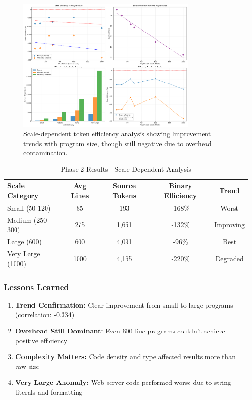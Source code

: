 \documentclass[11pt,a4paper]{article}
\begin{document}
\begin{figure}[H]
\centering
\includegraphics[width=0.8\textwidth]{scale_dependent_analysis.png}
\caption{Scale-dependent token efficiency analysis showing improvement trends with program size, though still negative due to overhead contamination.}
\label{fig:scale_analysis}
\end{figure}

\begin{table}[H]
\centering
\caption{Phase 2 Results - Scale-Dependent Analysis}
\begin{tabular}{lcccc}
\toprule
\textbf{Scale Category} & \textbf{Avg Lines} & \textbf{Source Tokens} & \textbf{Binary Efficiency} & \textbf{Trend}\\
\midrule
Small (50-120) & 85 & 193 & -168\% & Worst\\
Medium (250-300) & 275 & 1,651 & -132\% & Improving\\
Large (600) & 600 & 4,091 & -96\% & Best\\
Very Large (1000) & 1000 & 4,165 & -220\% & Degraded\\
\bottomrule
\end{tabular}
\end{table}

\subsubsection{Lessons Learned}
\begin{enumerate}
    \item \textbf{Trend Confirmation:} Clear improvement from small to large programs (correlation: -0.334)
    \item \textbf{Overhead Still Dominant:} Even 600-line programs couldn't achieve positive efficiency
    \item \textbf{Complexity Matters:} Code density and type affected results more than raw size
    \item \textbf{Very Large Anomaly:} Web server code performed worse due to string literals and formatting
\end{enumerate}
\end{document}
